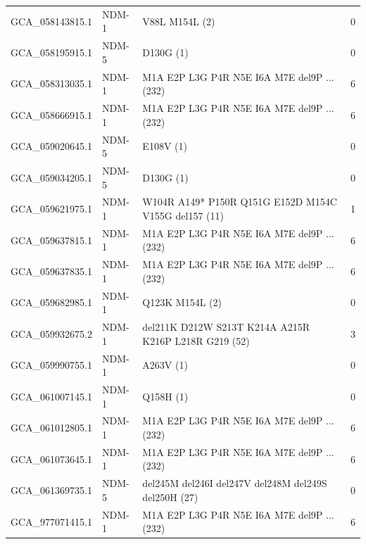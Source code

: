 \begin{longtable}{llll}
GCA\_058143815.1&NDM-1&V88L M154L (2)&0\\
GCA\_058195915.1&NDM-5&D130G (1)&0\\
GCA\_058313035.1&NDM-1&M1A E2P L3G P4R N5E I6A M7E del9P ... (232)&6\\
GCA\_058666915.1&NDM-1&M1A E2P L3G P4R N5E I6A M7E del9P ... (232)&6\\
GCA\_059020645.1&NDM-5&E108V (1)&0\\
GCA\_059034205.1&NDM-5&D130G (1)&0\\
GCA\_059621975.1&NDM-1&W104R A149* P150R Q151G E152D M154C V155G del157 (11)&1\\
GCA\_059637815.1&NDM-1&M1A E2P L3G P4R N5E I6A M7E del9P ... (232)&6\\
GCA\_059637835.1&NDM-1&M1A E2P L3G P4R N5E I6A M7E del9P ... (232)&6\\
GCA\_059682985.1&NDM-1&Q123K M154L (2)&0\\
GCA\_059932675.2&NDM-1&del211K D212W S213T K214A A215R K216P L218R G219 (52)&3\\
GCA\_059990755.1&NDM-1&A263V (1)&0\\
GCA\_061007145.1&NDM-1&Q158H (1)&0\\
GCA\_061012805.1&NDM-1&M1A E2P L3G P4R N5E I6A M7E del9P ... (232)&6\\
GCA\_061073645.1&NDM-1&M1A E2P L3G P4R N5E I6A M7E del9P ... (232)&6\\
GCA\_061369735.1&NDM-5&del245M del246I del247V del248M del249S del250H  (27)&0\\
GCA\_977071415.1&NDM-1&M1A E2P L3G P4R N5E I6A M7E del9P ... (232)&6\\
\hline\end{longtable}
